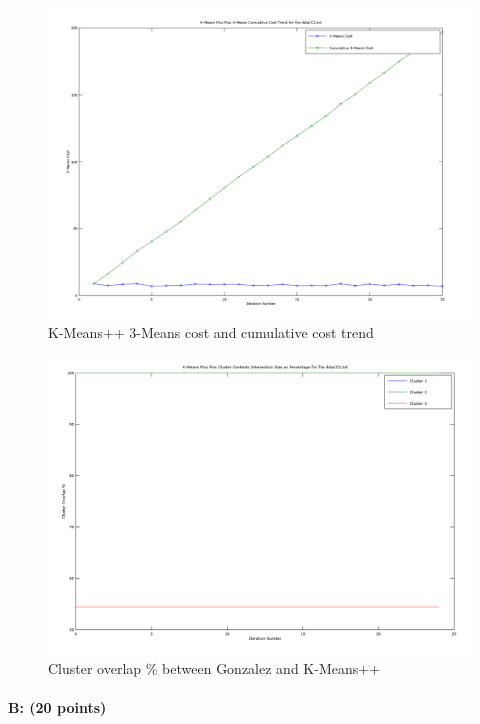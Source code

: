 \documentclass[11pt]{article}
\begin{document}
\begin{figure}[!htb]
\centering
\includegraphics[width=5in]{figures/2AKMPPCum.png}
\caption{K-Means++ 3-Means cost and cumulative cost trend}
\label{KPPCum}
\end{figure}

\begin{figure}[!htb]
\centering
\includegraphics[width=5in]{figures/2AOverlap.png}
\caption{Cluster overlap \% between Gonzalez and K-Means++}
\label{2BOverlap}
\end{figure}

\paragraph{B: (20 points)} 
\end{document}
